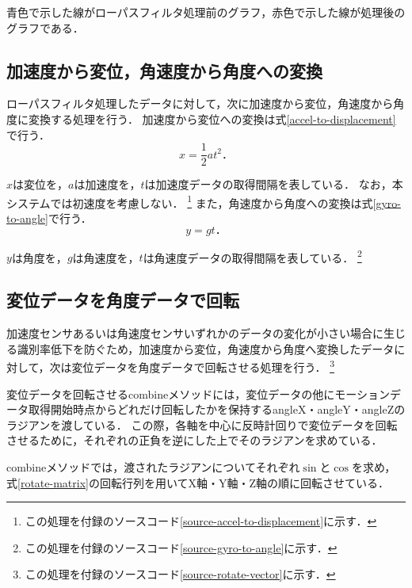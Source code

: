青色で示した線がローパスフィルタ処理前のグラフ，赤色で示した線が処理後のグラフである．

\subsection{加速度から変位，角速度から角度への変換}
ローパスフィルタ処理したデータに対して，次に加速度から変位，角速度から角度に変換する処理を行う．
加速度から変位への変換は式\ref{accel-to-displacement}で行う．
\begin{equation}
\label{accel-to-displacement}
x = \frac{1}{2} a t^2．
\end{equation}

$x$は変位を，$a$は加速度を，$t$は加速度データの取得間隔を表している．
なお，本システムでは初速度を考慮しない．
\footnote{この処理を付録のソースコード\ref{source-accel-to-displacement}に示す．}
また，角速度から角度への変換は式\ref{gyro-to-angle}で行う．
\begin{equation}
\label{gyro-to-angle}
y = g t．
\end{equation}

$y$は角度を，$g$は角速度を，$t$は角速度データの取得間隔を表している．
\footnote{この処理を付録のソースコード\ref{source-gyro-to-angle}に示す．}

\subsection{変位データを角度データで回転}
加速度センサあるいは角速度センサいずれかのデータの変化が小さい場合に生じる識別率低下を防ぐため，加速度から変位，角速度から角度へ変換したデータに対して，次は変位データを角度データで回転させる処理を行う．
\footnote{この処理を付録のソースコード\ref{source-rotate-vector}に示す．}

変位データを回転させるcombineメソッドには，変位データの他にモーションデータ取得開始時点からどれだけ回転したかを保持するangleX・angleY・angleZのラジアンを渡している．
この際，各軸を中心に反時計回りで変位データを回転させるために，それぞれの正負を逆にした上でそのラジアンを求めている．

combineメソッドでは，渡されたラジアンについてそれぞれ$\sin$と$\cos$を求め，式\ref{rotate-matrix}の回転行列を用いてX軸・Y軸・Z軸の順に回転させている．

